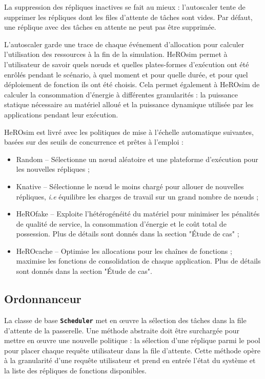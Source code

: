 La suppression des répliques inactives se fait au mieux : l'autoscaler tente de supprimer les répliques dont les files d'attente de tâches sont vides. Par défaut, une réplique avec des tâches en attente ne peut pas être supprimée.

L'autoscaler garde une trace de chaque événement d'allocation pour calculer l'utilisation des ressources à la fin de la simulation. HeROsim permet à l'utilisateur de savoir quels nœuds et quelles plates-formes d'exécution ont été enrôlés pendant le scénario, à quel moment et pour quelle durée, et pour quel déploiement de fonction ils ont été choisis. Cela permet également à HeROsim de calculer la consommation d'énergie à différentes granularités : la puissance statique nécessaire au matériel alloué et la puissance dynamique utilisée par les applications pendant leur exécution.

HeROsim est livré avec les politiques de mise à l'échelle automatique suivantes, basées sur des seuils de concurrence et prêtes à l'emploi :

\begin{itemize}
    \item Random -- Sélectionne un nœud aléatoire et une plateforme d'exécution pour les nouvelles répliques ;
    \item Knative -- Sélectionne le nœud le moins chargé pour allouer de nouvelles répliques, \textit{i.e} équilibre les charges de travail sur un grand nombre de nœuds ;
    \item HeROfake -- Exploite l'hétérogénéité du matériel pour minimiser les pénalités de qualité de service, la consommation d'énergie et le coût total de possession. Plus de détails sont donnés dans la section "Étude de cas" ;
    \item HeROcache -- Optimise les allocations pour les chaînes de fonctions ; maximise les fonctions de consolidation de chaque application. Plus de détails sont donnés dans la section "Étude de cas".
\end{itemize}

\subsection{Ordonnanceur}

La classe de base \textbf{\texttt{Scheduler}} met en œuvre la sélection des tâches dans la file d'attente de la passerelle. Une méthode abstraite doit être surchargée pour mettre en œuvre une nouvelle politique : la sélection d'une réplique parmi le pool pour placer chaque requête utilisateur dans la file d'attente. Cette méthode opère à la granularité d'une requête utilisateur et prend en entrée l'état du système et la liste des répliques de fonctions disponibles.

